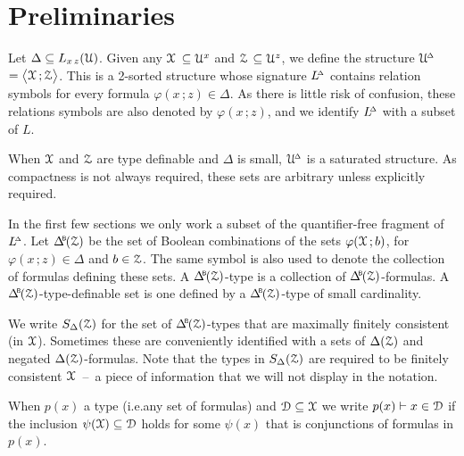 \section{Preliminaries}
\label{actions}

\def\ceq#1#2#3{\noindent\parbox[t]{15ex}{$\displaystyle #1$}\parbox{6ex}{\hfil $#2$}{$\displaystyle #3$}}


Let $\Delta\subseteq L_{x\,z}(\EuScript U)$.
Given any \emph{$\EuScript X$\/} $\subseteq\EuScript U^x$ and \emph{$\EuScript Z$\/} $\subseteq\EuScript U^z$, we define the structure \emph{$\EuScript U\kern-.2ex^{\scriptscriptstyle\Delta}$\/} $=\big\langle\EuScript X\,;\EuScript Z\big\rangle$.
This is a 2-sorted structure whose signature \emph{$L\kern-.4ex^{\scriptscriptstyle\Delta}$\/} contains relation symbols for every formula $\varphi(x\,;z)\in\Delta$.
As there is little risk of confusion, these relations symbols are also denoted by $\varphi(x\,;z)$, and we identify $L\kern-.4ex^{\scriptscriptstyle\Delta}$ with a subset of $L$.

When $\EuScript X$ and $\EuScript Z$ are type definable and $\Delta$ is small, $\EuScript U\kern-.2ex^{\scriptscriptstyle\Delta}$ is a saturated structure.
As compactness is not always required, these sets are arbitrary unless explicitly required.

In the first few sections we only work a subset of the quantifier-free fragment of $L\kern-.4ex^{\scriptscriptstyle\Delta}$.
Let $\BDelta(\Z)$ be the set of Boolean combinations of the sets $\varphi(\EuScript X\,;b)$, for $\varphi(x\,;z)\in\Delta$ and $b\in\EuScript Z$.
The same symbol is also used to denote the collection of formulas defining these sets.
A $\BDelta(\Z)$-type is a collection of $\BDelta(\Z)$-formulas.
A $\BDelta(\Z)$-type-definable set is one defined by a $\BDelta(\Z)$-type of small cardinality.

We write \emph{$S_\Delta(\EuScript Z)$\/} for the set of $\BDelta(\Z)$-types that are maximally finitely consistent (in $\EuScript X$).
Sometimes these are conveniently identified with a sets of $\Delta(\EuScript Z)$ and negated $\Delta(\EuScript Z)$-for\-mulas.
Note that the types in $S_\Delta(\EuScript Z)$ are required to be finitely consistent $\EuScript X$~--~a piece of information that we will not display in the notation.


When $p(x)$ a type (i.e.\@ any set of formulas) and $\EuScript D\subseteq\EuScript X$ we write $p(x)\vdash x\in\EuScript D$ if the inclusion $\psi(\EuScript X)\subseteq\EuScript D$ holds for some $\psi(x)$ that is conjunctions of formulas in $p(x)$.

